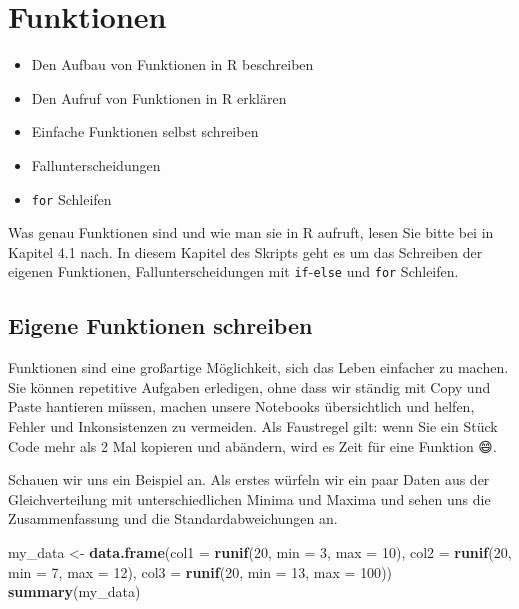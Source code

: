 \documentclass[]{book}
\newenvironment{Shaded}{\begin{snugshade}}{\end{snugshade}}
\newcommand{\DataTypeTok}[1]{\textcolor[rgb]{0.13,0.29,0.53}{#1}}
\newcommand{\DecValTok}[1]{\textcolor[rgb]{0.00,0.00,0.81}{#1}}
\newcommand{\KeywordTok}[1]{\textcolor[rgb]{0.13,0.29,0.53}{\textbf{#1}}}
\newcommand{\NormalTok}[1]{#1}
\newcommand{\StringTok}[1]{\textcolor[rgb]{0.31,0.60,0.02}{#1}}
\providecommand{\tightlist}{%
  \setlength{\itemsep}{0pt}\setlength{\parskip}{0pt}}
\newenvironment{rmdoutcomes}{
  \definecolor{outcomes}{rgb}{1.0, 0.92, 0.8}  %
  \color{black}
  \begin{mdframed}[backgroundcolor = outcomes]}
 {\end{mdframed}}
\begin{document}
\hypertarget{funktionen}{%
\chapter{Funktionen}\label{funktionen}}

\begin{rmdoutcomes}
\begin{itemize}
\tightlist
\item
  Den Aufbau von Funktionen in R beschreiben
\item
  Den Aufruf von Funktionen in R erklären
\item
  Einfache Funktionen selbst schreiben
\item
  Fallunterscheidungen
\item
  \texttt{for} Schleifen
\end{itemize}
\end{rmdoutcomes}

Was genau Funktionen sind und wie man sie in R aufruft, lesen Sie bitte bei \citet{Ligges2008} in Kapitel 4.1 nach. In diesem Kapitel des Skripts geht es um das Schreiben der eigenen Funktionen, Fallunterscheidungen mit \texttt{if}-\texttt{else} und \texttt{for} Schleifen.

\hypertarget{eigene-funktionen-schreiben}{%
\section{Eigene Funktionen schreiben}\label{eigene-funktionen-schreiben}}

Funktionen sind eine großartige Möglichkeit, sich das Leben einfacher zu machen. Sie können repetitive Aufgaben erledigen, ohne dass wir ständig mit Copy und Paste hantieren müssen, machen unsere Notebooks übersichtlich und helfen, Fehler und Inkonsistenzen zu vermeiden. Als Faustregel gilt: wenn Sie ein Stück Code mehr als 2 Mal kopieren und abändern, wird es Zeit für eine Funktion 😄.

Schauen wir uns ein Beispiel an. Als erstes würfeln wir ein paar Daten aus der Gleichverteilung mit unterschiedlichen Minima und Maxima und sehen uns die Zusammenfassung und die Standardabweichungen an.

\begin{Shaded}
\begin{Highlighting}[]
\NormalTok{my_data <-}\StringTok{ }\KeywordTok{data.frame}\NormalTok{(}\DataTypeTok{col1 =} \KeywordTok{runif}\NormalTok{(}\DecValTok{20}\NormalTok{, }\DataTypeTok{min =} \DecValTok{3}\NormalTok{, }\DataTypeTok{max =} \DecValTok{10}\NormalTok{),}
                      \DataTypeTok{col2 =} \KeywordTok{runif}\NormalTok{(}\DecValTok{20}\NormalTok{, }\DataTypeTok{min =} \DecValTok{7}\NormalTok{, }\DataTypeTok{max =} \DecValTok{12}\NormalTok{),}
                      \DataTypeTok{col3 =} \KeywordTok{runif}\NormalTok{(}\DecValTok{20}\NormalTok{, }\DataTypeTok{min =} \DecValTok{13}\NormalTok{, }\DataTypeTok{max =} \DecValTok{100}\NormalTok{))}
\KeywordTok{summary}\NormalTok{(my_data)}
\end{Highlighting}
\end{Shaded}
\end{document}
